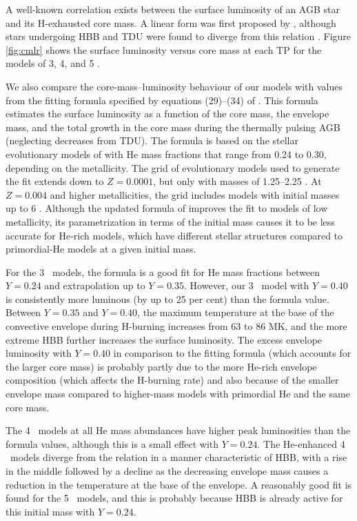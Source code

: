A well-known correlation exists between the surface luminosity of an AGB star and its H-exhausted core mass. A linear form was first proposed by \citet{Paczynski:1970uk}, although stars undergoing HBB and TDU were found to diverge from this relation \citep{Bloecker:1991tt,Boothroyd:1992gi,Lattanzio:1992uz,Marigo:1999va}. Figure \ref{fig:cmlr} shows the surface luminosity versus core mass at each TP for the models of 3, 4, and 5 \Msun.

We also compare the core-mass--luminosity behaviour of our models with values from the fitting formula specified by equations (29)--(34) of \citet{Izzard:2004bq}. This formula estimates the surface luminosity as a function of the core mass, the envelope mass, and the total growth in the core mass during the thermally pulsing AGB (neglecting decreases from TDU). The formula is based on the stellar evolutionary models of \citet{Karakas:2002ci} with He mass fractions that range from 0.24 to 0.30, depending on the metallicity. The grid of evolutionary models used to generate the fit extends down to $Z=0.0001$, but only with masses of 1.25--2.25 \Msun. At $Z=0.004$ and higher metallicities, the grid includes models with initial masses up to 6 \Msun. Although the updated formula of \citet{Izzard:2006ij} improves the fit to models of low metallicity, its parametrization in terms of the initial mass causes it to be less accurate for He-rich models, which have different stellar structures compared to primordial-He models at a given initial mass.

For the 3 \Msun\ models, the formula is a good fit for He mass fractions between $Y=0.24$ and extrapolation up to $Y=0.35$. However, our 3 \Msun\ model with $Y=0.40$ is consistently more luminous (by up to 25 per cent) than the formula value. Between $Y=0.35$ and $Y=0.40$, the maximum temperature at the base of the convective envelope during H-burning increases from 63 to 86 MK, and the more extreme HBB further increases the surface luminosity. The excess envelope luminosity with $Y=0.40$ in comparison to the fitting formula (which accounts for the larger core mass) is probably partly due to the more He-rich envelope composition (which affects the H-burning rate) and also because of the smaller envelope mass compared to higher-mass models with primordial He and the same core mass.

The 4 \Msun\ models at all He mass abundances have higher peak luminosities than the formula values, although this is a small effect with $Y=0.24$. The He-enhanced 4 \Msun\ models diverge from the relation in a manner characteristic of HBB, with a rise in the middle followed by a decline as the decreasing envelope mass causes a reduction in the temperature at the base of the envelope. A reasonably good fit is found for the 5 \Msun\ models, and this is probably because HBB is already active for this initial mass with $Y=0.24$.

